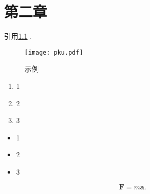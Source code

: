 \chapter{第二章}

\thispagestyle{fancy}


引用\cref{fig:1} .

\begin{figure}[htp]
	\centering
	\texttt{[image: pku.pdf]}
	\caption{示例}
	\label{fig:1}
\end{figure}

\begin{enumerate}
    \item 1
    \item 2
    \item 3
\end{enumerate}

\begin{itemize}
    \item 1
    \item 2
    \item 3
\end{itemize}

\begin{equation}
    \bm{F} = m\bm{a}.
\end{equation}